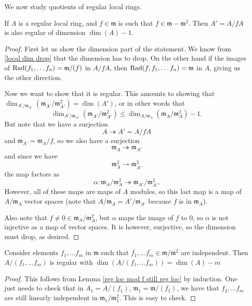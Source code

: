 We now study quotients of regular local rings. 
\begin{lemma}
If $A$ is a regular local ring, and $f \in \mathfrak{m}$ is such that $f \in
\mathfrak{m}- \mathfrak{m}^2$. Then $A'=A/fA$ is also regular of dimension $\dim(A)-1$.
\label{reg loc mod f still reg loc}
\end{lemma}
\begin{proof} First let us show the dimension part of the statement. We know from \ref{local dim drop} that the dimension has to drop. On the other hand if the images of $\operatorname{Rad}(f_1, \ldots f_n)=\mathfrak{m}/(f)$ in $A/fA$, then $\operatorname{Rad}(f,f_1, \ldots f_n)=\mathfrak{m}$ in $A$, giving us the other direction.

Now we want to show that it is regular. This amounts to showing that $\dim_{A'/\mathfrak{m}_{A'}}(\mathfrak{m}_{A'}/\mathfrak{m}_{A'}^2)=\dim(A')$, or in other words that \[\dim_{A'/\mathfrak{m}_{A'}}(\mathfrak{m}_{A'}/\mathfrak{m}_{A'}^2) \leq \dim_{A/\mathfrak{m}_A}(\mathfrak{m}_{A}/\mathfrak{m}_A^2)-1.\]
But note that we have a surjection
\[A \twoheadrightarrow A'=A/fA\]
and $\mathfrak{m}_{A'}=\mathfrak{m}_A/f$, so we also have a surjection
\[\mathfrak{m}_A \twoheadrightarrow \mathfrak{m}_{A'}\]
and since we have
\[\mathfrak{m}_A^2 \to \mathfrak{m}_{A'}^2\]
the map factors as
\[\alpha: \mathfrak{m}_A/\mathfrak{m}_A^2 \twoheadrightarrow \mathfrak{m}_{A'}/\mathfrak{m}_{A'}^2.\]
However, all of these maps are maps of $A$ modules, so this last map is a map of $A/\mathfrak{m}_A$ vector spaces (note that $A/\mathfrak{m}_A=A'/\mathfrak{m}_{A'}$ because $f$ is in $\mathfrak{m}_A$).

Also note that $f \neq 0 \in \mathfrak{m}_A/\mathfrak{m}_A^2$, but $\alpha$ maps the image of $f$ to 0, so $\alpha$ is not injective as a map of vector spaces. It is however, surjective, so the dimension must drop, as desired.
\end{proof}



\begin{corollary}  Consider elements $f_1, \ldots f_m$ in $\mathfrak{m}$ such that $\bar{f_1}, \ldots \bar{f_m} \in \mathfrak{m}/\mathfrak{m}^2$ are independent. Then $A/(f_1, \ldots f_m)$ is regular with $\dim(A/(f_1, \ldots f_m))=\dim(A)-m$
\label{reg local mod fs still reg loc}
\end{corollary}
\begin{proof} This follows from Lemma \ref{reg loc mod f still reg loc} by induction. One just needs to check that in $A_1=A/(f_1)$, $\mathfrak{m}_1=\mathfrak{m}/(f_1)$, we have that $f_2, \ldots f_m$ are still linearly independent in $\mathfrak{m}_1/\mathfrak{m}_1^2$. This is easy to check.
\end{proof}



